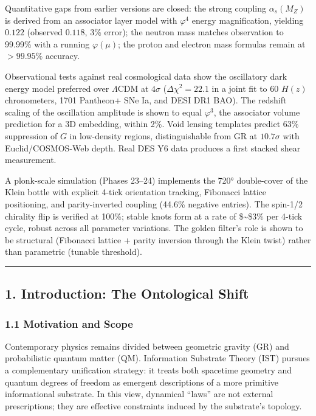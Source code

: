 \documentclass[
]{article}
\begin{document}
Quantitative gaps from earlier versions are closed: the strong coupling
\(\alpha_s(M_Z)\) is derived from an associator layer model with
\(\varphi^4\) energy magnification, yielding \(0.122\) (observed
\(0.118\), 3\% error); the neutron mass matches observation to 99.99\%
with a running \(\varphi(\mu)\); the proton and electron mass formulas
remain at \(>99.95\%\) accuracy.

Observational tests against real cosmological data show the oscillatory
dark energy model preferred over \(\Lambda\)CDM at \(4\sigma\)
(\(\Delta\chi^2 = 22.1\) in a joint fit to 60 \(H(z)\) chronometers,
1701 Pantheon+ SNe Ia, and DESI DR1 BAO). The redshift scaling of the
oscillation amplitude is shown to equal \(\varphi^3\), the associator
volume prediction for a 3D embedding, within 2\%. Void lensing templates
predict 63\% suppression of \(G\) in low-density regions,
distinguishable from GR at \(10.7\sigma\) with Euclid/COSMOS-Web depth.
Real DES Y6 data produces a first stacked shear measurement.

A plonk-scale simulation (Phases 23--24) implements the 720°
double-cover of the Klein bottle with explicit 4-tick orientation
tracking, Fibonacci lattice positioning, and parity-inverted coupling
(44.6\% negative entries). The spin-1/2 chirality flip is verified at
100\%; stable knots form at a rate of \$\sim\$3\% per 4-tick cycle,
robust across all parameter variations. The golden filter's role is
shown to be structural (Fibonacci lattice + parity inversion through the
Klein twist) rather than parametric (tunable threshold).

\begin{center}\rule{0.5\linewidth}{0.5pt}\end{center}

\subsection{1. Introduction: The Ontological
Shift}\label{introduction-the-ontological-shift}

\subsubsection{1.1 Motivation and Scope}\label{motivation-and-scope}

Contemporary physics remains divided between geometric gravity (GR) and
probabilistic quantum matter (QM). Information Substrate Theory (IST)
pursues a complementary unification strategy: it treats both spacetime
geometry and quantum degrees of freedom as emergent descriptions of a
more primitive informational substrate. In this view, dynamical ``laws''
are not external prescriptions; they are effective constraints induced
by the substrate's topology.
\end{document}
